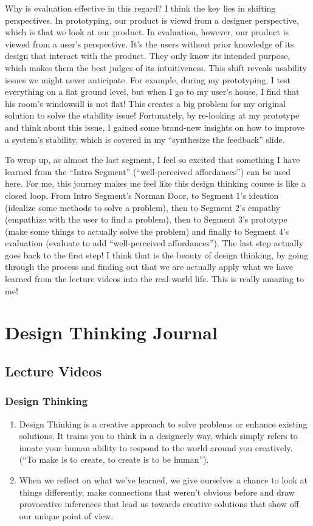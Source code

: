 \documentclass[math,code]{amznotes}
\theoremstyle{remark}
\begin{document}
Why is evaluation effective in this regard? I think the key lies in shifting perspectives. In prototyping, our product is viewd from a designer perspective, which is that we look at our product. In evaluation, however, our product is viewed from a user's perspective. It's the users without prior knowledge of its design that interact with the product. They only know its intended purpose, which makes them the best judges of its intuitiveness. This shift reveals usability issues we might never anticipate. For example, during my prototyping, I test everything on a flat ground level, but when I go to my user's house, I find that his room's windowsill is not flat! This creates a big problem for my original solution to solve the stability issue! Fortunately, by re-looking at my prototype and think about this issue, I gained some brand-new insights on how to improve a system's stability, which is covered in my ``synthesize the feedback'' slide.

To wrap up, as almost the last segment, I feel so excited that something I have learned from the ``Intro Segment'' (``well-perceived affordances'') can be used here. For me, this journey makes me feel like this design thinking course is like a closed loop. From Intro Segment's Norman Door, to Segment 1's ideation (idealize some methods to solve a problem), then to Segment 2's empathy (empathize with the user to find a problem), then to Segment 3's prototype (make some things to actually solve the problem) and finally to Segment 4's evaluation (evaluate to add ``well-perceived affordances''). The last step actually goes back to the first step! I think that is the beauty of design thinking, by going through the process and finding out that we are actually apply what we have learned from the lecture videos into the real-world life. This is really amazing to me!

\chapter{Design Thinking Journal}
\section{Lecture Videos}
\subsection{Design Thinking}
\begin{enumerate}
    \item Design Thinking is a creative approach to solve problems or enhance existing solutions. It trains you to think in a designerly way, which simply refers to innate your human ability to respond to the world around you creatively. (``To make is to create, to create is to be human'').
    \item When we reflect on what we've learned, we give ourselves a chance to look at things differently, make connections that weren't obvious before and draw provocative inferences that lead us towards creative solutions that show off our unique point of view.
\end{enumerate}
\end{document}
